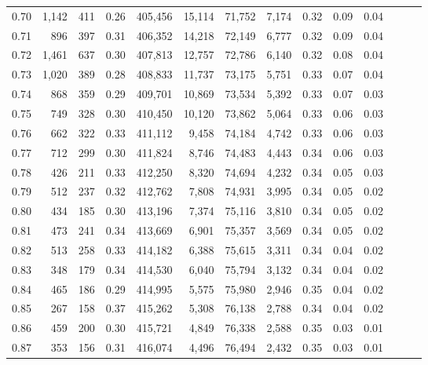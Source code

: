 \begin{tabular}{rrrrrrrrrrrrrr}
0.70 &   1,142 &    411 &  0.26 &  405,456 &   15,114 &  71,752 &   7,174 &  0.32 &  0.09 &      0.04 \\
0.71 &     896 &    397 &  0.31 &  406,352 &   14,218 &  72,149 &   6,777 &  0.32 &  0.09 &      0.04 \\
0.72 &   1,461 &    637 &  0.30 &  407,813 &   12,757 &  72,786 &   6,140 &  0.32 &  0.08 &      0.04 \\
0.73 &   1,020 &    389 &  0.28 &  408,833 &   11,737 &  73,175 &   5,751 &  0.33 &  0.07 &      0.04 \\
0.74 &     868 &    359 &  0.29 &  409,701 &   10,869 &  73,534 &   5,392 &  0.33 &  0.07 &      0.03 \\
0.75 &     749 &    328 &  0.30 &  410,450 &   10,120 &  73,862 &   5,064 &  0.33 &  0.06 &      0.03 \\
0.76 &     662 &    322 &  0.33 &  411,112 &    9,458 &  74,184 &   4,742 &  0.33 &  0.06 &      0.03 \\
0.77 &     712 &    299 &  0.30 &  411,824 &    8,746 &  74,483 &   4,443 &  0.34 &  0.06 &      0.03 \\
0.78 &     426 &    211 &  0.33 &  412,250 &    8,320 &  74,694 &   4,232 &  0.34 &  0.05 &      0.03 \\
0.79 &     512 &    237 &  0.32 &  412,762 &    7,808 &  74,931 &   3,995 &  0.34 &  0.05 &      0.02 \\
0.80 &     434 &    185 &  0.30 &  413,196 &    7,374 &  75,116 &   3,810 &  0.34 &  0.05 &      0.02 \\
0.81 &     473 &    241 &  0.34 &  413,669 &    6,901 &  75,357 &   3,569 &  0.34 &  0.05 &      0.02 \\
0.82 &     513 &    258 &  0.33 &  414,182 &    6,388 &  75,615 &   3,311 &  0.34 &  0.04 &      0.02 \\
0.83 &     348 &    179 &  0.34 &  414,530 &    6,040 &  75,794 &   3,132 &  0.34 &  0.04 &      0.02 \\
0.84 &     465 &    186 &  0.29 &  414,995 &    5,575 &  75,980 &   2,946 &  0.35 &  0.04 &      0.02 \\
0.85 &     267 &    158 &  0.37 &  415,262 &    5,308 &  76,138 &   2,788 &  0.34 &  0.04 &      0.02 \\
0.86 &     459 &    200 &  0.30 &  415,721 &    4,849 &  76,338 &   2,588 &  0.35 &  0.03 &      0.01 \\
0.87 &     353 &    156 &  0.31 &  416,074 &    4,496 &  76,494 &   2,432 &  0.35 &  0.03 &      0.01 \\

\end{tabular}
